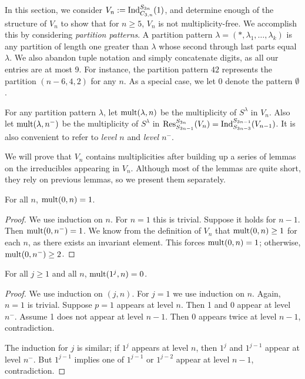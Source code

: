 In this section, we consider $V_n := \textup{Ind}_{C_{3,n}}^{S_{3n}}(1)$, and determine enough of the structure of $V_n$ to show that
for $n \ge 5$, $V_n$ is not multiplicity-free. We accomplish this by considering {\em partition patterns}. A partition pattern $\lambda = (*,\lambda_1,\ldots,\lambda_k)$ is any partition of length one greater than $\lambda$ whose second through last parts equal $\lambda$. We also abandon tuple notation and simply concatenate digits, as all our entries are at most 9. For instance, the partition pattern $42$ represents the partition $(n-6,4,2)$ for any $n$. As a special case, we let $0$ denote the pattern $\emptyset$.

For any partition pattern $\lambda$, let $\textup{mult}(\lambda,n)$ be the multiplicity of $S^\lambda$ in $V_n$. Also let $\textup{mult}(\lambda,n^-)$ be the multiplicity of $S^\lambda$ in $\textup{Res}^{S_{3n}}_{S_{3n-1}}(V_n) = \textup{Ind}_{S_{3n-3}}^{S_{3n-1}}(V_{n-1})$. It is also convenient to refer to {\em level $n$} and {\em level $n^-$}. 

We will prove that $V_n$ contains multiplicities after building up a series of lemmas on the irreducibles appearing in $V_n$.
Although most of the lemmas are quite short, they rely on previous lemmas, so we present them separately.


\begin{lemma}
For all $n$, $\textup{mult}(0,n)=1$.
\end{lemma}
\begin{proof}
We use induction on $n$. For $n=1$ this is trivial. Suppose it holds for $n-1$.
Then $\textup{mult}(0,n^-)=1$.
We know from the definition of $V_n$ that $\textup{mult}(0,n) \ge 1$ for each $n$, as there exists an invariant element.
This forces $\textup{mult}(0,n)=1$; otherwise, $\textup{mult}(0,n^-) \ge 2$.
\end{proof}

\begin{lemma}\label{BV:lemma1j}
For all $j \ge 1$ and all $n$, $\textup{mult}(1^j,n)=0$.
\end{lemma}
\begin{proof}
We use induction on $(j,n)$. 
For $j = 1$ we use induction on $n$.
Again, $n=1$ is trivial.
Suppose $p = 1$ appears at level $n$.
Then 1 and 0 appear at level $n^-$.
Assume 1 does not appear at level $n-1$. Then 0 appears twice at level $n-1$, contradiction.

The induction for $j$ is similar; if $1^j$ appears at level $n$, then $1^j$ and $1^{j-1}$ appear at level $n^-$. 
But $1^{j-1}$ implies one of $1^{j-1}$ or $1^{j-2}$ appear at level $n-1$, contradiction.

\end{proof}

